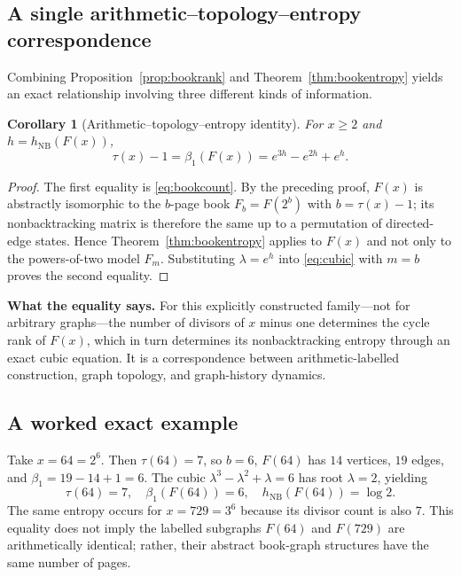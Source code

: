 \documentclass[11pt,a4paper]{article}
\newtheorem{corollary}[theorem]{Corollary}
\theoremstyle{definition}\newtheorem{definition}[theorem]{Definition}
\newcommand{\NB}{\mathrm{NB}}
\begin{document}
\subsection{A single arithmetic--topology--entropy correspondence}
Combining Proposition~\ref{prop:bookrank} and Theorem~\ref{thm:bookentropy} yields an exact relationship involving three different kinds of information.
\begin{corollary}[Arithmetic--topology--entropy identity]\label{cor:chain}
For $x\ge2$ and $h=h_{\NB}(F(x))$,
\begin{equation}\label{eq:chain}
\boxed{\tau(x)-1=\beta_1(F(x))=e^{3h}-e^{2h}+e^h.}
\end{equation}
\end{corollary}
\begin{proof}
The first equality is \eqref{eq:bookcount}. By the preceding proof, $F(x)$ is abstractly isomorphic to the $b$-page book $F_b=F(2^b)$ with $b=\tau(x)-1$; its nonbacktracking matrix is therefore the same up to a permutation of directed-edge states. Hence Theorem~\ref{thm:bookentropy} applies to $F(x)$ and not only to the powers-of-two model $F_m$. Substituting $\lambda=e^h$ into \eqref{eq:cubic} with $m=b$ proves the second equality.
\end{proof}

\begin{takeaway}
\textbf{What the equality says.} For this explicitly constructed family---not for arbitrary graphs---the number of divisors of $x$ minus one determines the cycle rank of $F(x)$, which in turn determines its nonbacktracking entropy through an exact cubic equation. It is a correspondence between arithmetic-labelled construction, graph topology, and graph-history dynamics.
\end{takeaway}

\subsection{A worked exact example}
Take $x=64=2^6$. Then $\tau(64)=7$, so $b=6$, $F(64)$ has $14$ vertices, $19$ edges, and $\beta_1=19-14+1=6$. The cubic $\lambda^3-\lambda^2+\lambda=6$ has root $\lambda=2$, yielding
\begin{equation}\label{eq:64}
\boxed{\tau(64)=7,\quad \beta_1(F(64))=6,\quad h_{\NB}(F(64))=\log2.}
\end{equation}
The same entropy occurs for $x=729=3^6$ because its divisor count is also $7$. This equality does not imply the labelled subgraphs $F(64)$ and $F(729)$ are arithmetically identical; rather, their abstract book-graph structures have the same number of pages.
\end{document}
